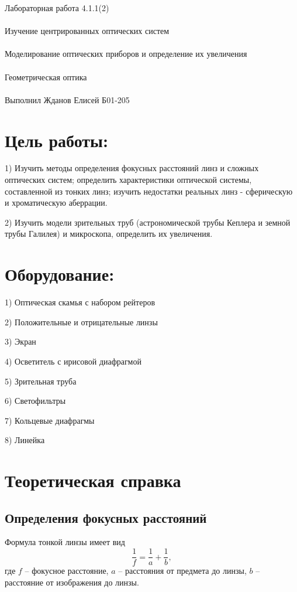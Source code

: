 \documentclass{astroedu-lab}
\begin{document}
\pagestyle{plain}

\begin{problem}{\huge Лабораторная работа 4.1.1(2)\\\\Изучение центрированных оптических систем\\\\Моделирование оптических приборов и определение их увеличения\\\\Геометрическая оптика\\\\Выполнил Жданов Елисей Б01-205}

\section{Цель работы:}

1) Изучить методы определения фокусных расстояний
линз и сложных оптических систем; определить характеристики оптической системы, составленной из тонких линз; изучить недостатки
реальных линз - сферическую и хроматическую аберрации.

2) Изучить модели зрительных труб (астрономической
трубы Кеплера и земной трубы Галилея) и микроскопа, определить
их увеличения.

\section{Оборудование:}

1) Оптическая скамья с набором рейтеров

2) Положительные и отрицательные линзы

3) Экран

4) Осветитель с ирисовой диафрагмой

5) Зрительная труба

6) Светофильтры

7) Кольцевые диафрагмы

8) Линейка

\section{Теоретическая справка}

\subsection*{Определения фокусных расстояний}
Формула тонкой линзы имеет вид
\begin{equation}
    \frac{1}{f} = \frac{1}{a} + \frac{1}{b},
\end{equation}
\noindent
где $f$ -- фокусное расстояние, $a$ -- расстояния от предмета до линзы, $b$ -- расстояние от изображения до линзы.


\end{problem}
\end{document}
